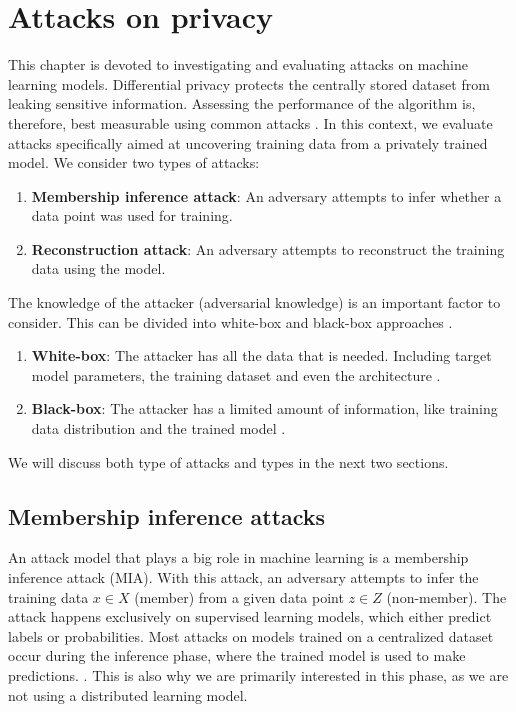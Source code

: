 \chapter{Attacks on privacy} \label{section: MIA}
This chapter is devoted to investigating and evaluating attacks on machine learning models.
Differential privacy protects the centrally stored dataset from leaking sensitive information.
Assessing the performance of the algorithm is, therefore, best measurable using common attacks \citep{jayaraman_evaluating_nodate}.
In this context, we evaluate attacks specifically aimed at uncovering training data from a privately trained model.
We consider two types of attacks:
\begin{enumerate}
  \item \textbf{Membership inference attack}: An adversary attempts to infer whether a data point was used for training.
  \item \textbf{Reconstruction attack}: An adversary attempts to reconstruct the training data using the model.
\end{enumerate}
The knowledge of the attacker (adversarial knowledge) is an important factor to consider.
This can be divided into white-box and black-box approaches \citep{hu_membership_2022}.
\begin{enumerate}
  \item \textbf{White-box}: The attacker has all the data that is needed. Including target model parameters, the training dataset and even the architecture \citep{hu_membership_2022}.
  \item \textbf{Black-box}: The attacker has a limited amount of information, like training data distribution and the trained model \citep{hu_membership_2022}.
\end{enumerate}
We will discuss both type of attacks and types in the next two sections.

\section{Membership inference attacks}
An attack model that plays a big role in machine learning is a membership inference attack (MIA).
With this attack, an adversary attempts to infer the training data $x \in X$ (member) from a given data point $z \in Z$ (non-member).
The attack happens exclusively on supervised learning models, which either predict labels or probabilities.
Most attacks on models trained on a centralized dataset occur during the inference phase, where the trained model is used to make predictions. \citep{rigaki_survey_2021}.
This is also why we are primarily interested in this phase, as we are not using a distributed learning model.

